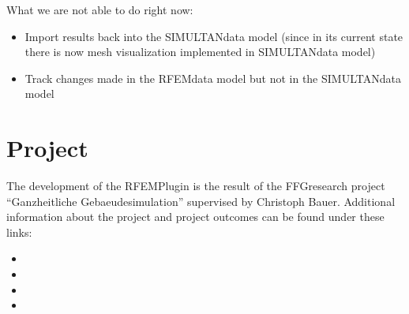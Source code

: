 \documentclass[letterpaper,10pt,english]{jupyterBook}
\begin{document}
\sphinxAtStartPar
What we are not able to do right now:
\begin{itemize}
\item {} 
\sphinxAtStartPar
Import results back into the SIMULTAN\sphinxhyphen{}data model (since in its current state there is now mesh visualization
implemented in SIMULTAN\sphinxhyphen{}data model)

\item {} 
\sphinxAtStartPar
Track changes made in the RFEM\sphinxhyphen{}data model but not in the SIMULTAN\sphinxhyphen{}data model

\end{itemize}


\section{Project}
\label{\detokenize{Introduction:project}}
\sphinxAtStartPar
The development of the RFEM\sphinxhyphen{}Plugin is the result of the FFG\sphinxhyphen{}research project “Ganzheitliche Gebaeudesimulation”
supervised by Christoph Bauer. Additional information about the project and project outcomes can be found under these
links:
\begin{itemize}
\item {} 
\sphinxAtStartPar
{}

\item {} 
\sphinxAtStartPar
{}

\item {} 
\sphinxAtStartPar
{}

\item {} 
\sphinxAtStartPar
{}

\end{itemize}
\end{document}
